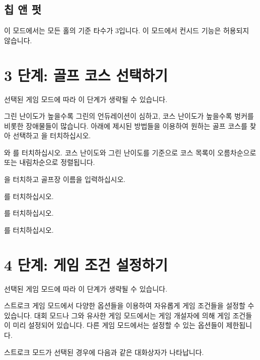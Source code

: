 \documentclass[10pt, openright, language=korean]{hzguide}
\begin{document}
\subsection{칩 앤 펏}

이 모드에서는 모든 홀의 기준 타수가 3입니다. 이 모드에서 컨시드 기능은 허용되지 않습니다.

\newpage
\section{3 단계: 골프 코스 선택하기}

\begin{Note}
선택된 게임 모드에 따라 이 단계가 생략될 수 있습니다.
\end{Note}

그린 난이도가 높을수록 그린의 언듀레이션이 심하고, 코스 난이도가 높을수록 벙커를 비롯한 장애물들이 많습니다.
아래에 제시된 방법들을 이용하여 원하는 골프 코스를 찾아 선택하고 을 터치하십시오.


와 를 터치하십시오.
코스 난이도와 그린 난이도를 기준으로 코스 목록이 오름차순으로 또는 내림차순으로 정렬됩니다.

을 터치하고 골프장 이름을 입력하십시오.

를 터치하십시오.

를 터치하십시오.

를 터치하십시오.

\newpage
\section{4 단계: 게임 조건 설정하기}
\label{sec:game_options}

\begin{Note}
선택된 게임 모드에 따라 이 단계가 생략될 수 있습니다.
\end{Note}

스트로크 게임 모드에서 다양한 옵션들을 이용하여 자유롭게 게임 조건들을 설정할 수 있습니다.
대회 모드나 그와 유사한 게임 모드에서는 게임 개설자에 의해 게임 조건들이 미리 설정되어 있습니다.
다른 게임 모드에서는 설정할 수 있는 옵션들이 제한됩니다.

스트로크 모드가 선택된 경우에 다음과 같은 대화상자가 나타납니다.
\end{document}
